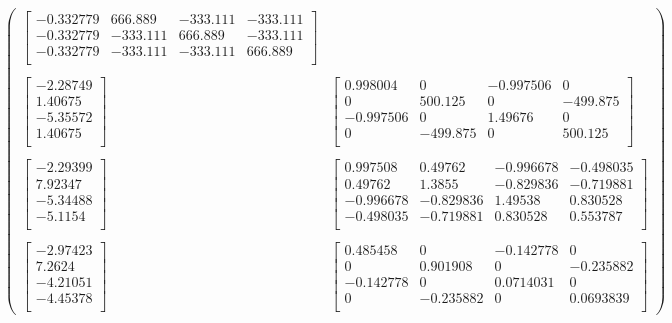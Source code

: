 \documentclass[10pt,oneside,x11names]{article}
\begin{document}
\begin{equation}
\begin{pmatrix}
\begin{bmatrix}
 -0.332779 & 666.889 & -333.111 & -333.111 \\
 -0.332779 & -333.111 & 666.889 & -333.111 \\
 -0.332779 & -333.111 & -333.111 & 666.889 \\
\end{bmatrix}
\\ \\
\begin{bmatrix}
 -2.28749 \\
 1.40675 \\
 -5.35572 \\
 1.40675 \\
\end{bmatrix}
&
\begin{bmatrix}
 0.998004 & 0 & -0.997506 & 0 \\
 0 & 500.125 & 0 & -499.875 \\
 -0.997506 & 0 & 1.49676 & 0 \\
 0 & -499.875 & 0 & 500.125 \\
\end{bmatrix}
\\ \\
\begin{bmatrix}
 -2.29399 \\
 7.92347 \\
 -5.34488 \\
 -5.1154 \\
\end{bmatrix}
&
\begin{bmatrix}
 0.997508 & 0.49762 & -0.996678 & -0.498035 \\
 0.49762 & 1.3855 & -0.829836 & -0.719881 \\
 -0.996678 & -0.829836 & 1.49538 & 0.830528 \\
 -0.498035 & -0.719881 & 0.830528 & 0.553787 \\
\end{bmatrix}
\\ \\
\begin{bmatrix}
 -2.97423 \\
 7.2624 \\
 -4.21051 \\
 -4.45378 \\
\end{bmatrix}
&
\begin{bmatrix}
 0.485458 & 0 & -0.142778 & 0 \\
 0 & 0.901908 & 0 & -0.235882 \\
 -0.142778 & 0 & 0.0714031 & 0 \\
 0 & -0.235882 & 0 & 0.0693839 \\
\end{bmatrix}
\end{pmatrix}
\end{equation}
\end{document}
